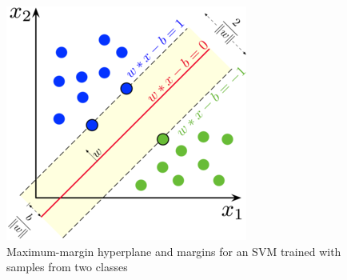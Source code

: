 \documentclass[12pt]{article}
\begin{document}
\begin{figure}[H]
\centering
\includegraphics[scale=3]{SVM_margin.png}
\caption{Maximum-margin hyperplane and margins for an SVM trained with samples from two classes}
\end{figure}
\end{document}

